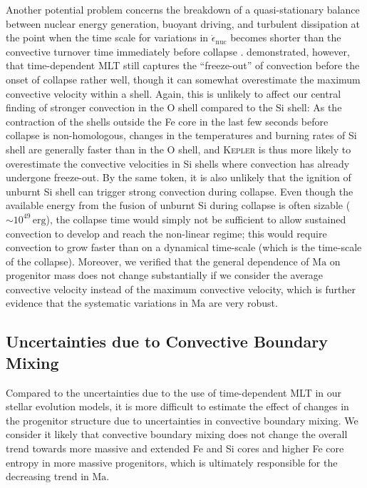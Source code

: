 \documentclass[useAMS,usenatbib]{mnras}
\begin{document}
Another potential problem concerns the breakdown of a quasi-stationary
balance between nuclear energy generation, buoyant driving, and
turbulent dissipation at the point when the time scale for variations
in $\dot{\epsilon}_\mathrm{nuc}$ becomes shorter than the convective
turnover time immediately before collapse \citep{mueller_16c}.
\citet{mueller_16c} demonstrated, however, that time-dependent MLT
still captures the ``freeze-out'' of convection before the onset of
collapse rather well, though it can somewhat overestimate the maximum
convective velocity within a shell. 
Again, this is unlikely to affect
our central finding of stronger convection in the O shell compared to
the Si shell: As the contraction of the shells outside the Fe core in
the last few seconds before collapse is non-homologous, changes in the
temperatures and burning rates of Si shell are generally faster than
in the O shell, and \textsc{Kepler} is thus more likely to
overestimate the convective velocities in Si shells where convection
has already undergone freeze-out. By the same token,
it is also unlikely that the ignition of unburnt Si shell
can trigger strong convection during collapse. Even though
the available energy from the fusion of
unburnt Si during collapse is often sizable
($\mathord{\sim} 10^{49}\, \mathrm{erg}$), the collapse time
would simply not be sufficient to allow sustained convection
to develop and reach the non-linear regime; this would require
convection to grow faster than on a dynamical time-scale
(which is the time-scale of the collapse). Moreover, we verified
that the general dependence of $\mathrm{Ma}$ on progenitor mass
does not change substantially if we consider the average convective
velocity instead of the maximum convective velocity, which is further evidence that
the systematic variations in $\mathrm{Ma}$ are very robust.



\subsection{Uncertainties due to Convective Boundary Mixing}
Compared to the uncertainties due to the use of time-dependent MLT in
our stellar evolution models, it is more difficult to estimate the
effect of changes in the progenitor structure due to uncertainties in
convective boundary mixing. We consider it likely that convective
boundary mixing does not change the overall trend towards more massive
and extended Fe and Si cores and higher Fe core entropy in more
massive progenitors, which is ultimately responsible for the
decreasing trend in $\mathrm{Ma}$. 
\end{document}
